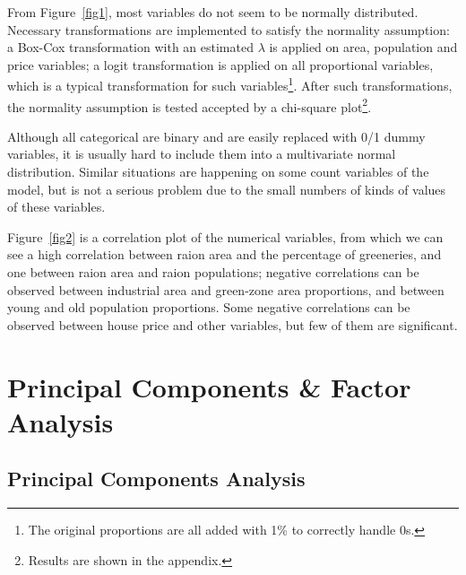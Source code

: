 \documentclass{article}
\begin{document}
From Figure~\ref{fig1}, most variables do not seem to be normally distributed. Necessary transformations are implemented to satisfy the normality assumption: a Box-Cox transformation with an estimated $\lambda$ is applied on area, population and price variables; a logit transformation is applied on all proportional variables, which is a typical transformation for such variables\footnote{The original proportions are all added with 1\% to correctly handle 0s.}. After such transformations, the normality assumption is tested accepted by a chi-square plot\footnote{Results are shown in the appendix.}.

Although all categorical are binary and are easily replaced with 0/1 dummy variables, it is usually hard to include them into a multivariate normal distribution. Similar situations are happening on some count variables of the model, but is not a serious problem due to the small numbers of kinds of values of these variables.

Figure~\ref{fig2} is a correlation plot of the numerical variables, from which we can see a high correlation between raion area and the percentage of greeneries, and one between raion area and raion populations; negative correlations can be observed between industrial area and green-zone area proportions, and between young and old population proportions. Some negative correlations can be observed between house price and other variables, but few of them are significant.

\section{Principal Components \& Factor Analysis}

\subsection{Principal Components Analysis}

\label{PCA}
\end{document}
